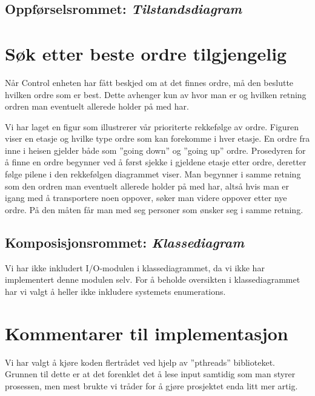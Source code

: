 \documentclass[language=norsk]{ezreport}
\begin{document}
\subsection*{Oppførselsrommet: \emph{Tilstandsdiagram}}

\newpage
\section*{Søk etter beste ordre tilgjengelig}
Når Control enheten har fått beskjed om at det finnes ordre, må den beslutte hvilken ordre som er best. Dette avhenger kun av hvor man er og hvilken retning ordren man eventuelt allerede holder på med har. 

Vi har laget en figur som illustrerer vår prioriterte rekkefølge av ordre. Figuren viser en etasje og hvilke type ordre som kan forekomme i hver etasje. En ordre fra inne i heisen gjelder både som ''going down'' og ''going up'' ordre. Prosedyren for å finne en ordre begynner ved å først sjekke i gjeldene etasje etter ordre, deretter følge pilene i den rekkefølgen diagrammet viser. Man begynner i samme retning som den ordren man eventuelt allerede holder på med har, altså hvis man er igang med å transportere noen oppover, søker man videre oppover etter nye ordre. På den måten får man med seg personer som ønsker seg i samme retning.


\subsection*{Komposisjonsrommet: \emph{Klassediagram}}


Vi har ikke inkludert I/O-modulen i klassediagrammet, da vi ikke har implementert denne modulen selv. For å beholde oversikten i klassediagrammet har vi valgt å heller ikke inkludere systemets enumerations.

\section*{Kommentarer til implementasjon}
Vi har valgt å kjøre koden flertrådet ved hjelp av ''pthreads'' biblioteket. Grunnen til dette er at det forenklet det å lese input samtidig som man styrer prosessen, men mest brukte vi tråder for å gjøre prosjektet enda litt mer artig. 
\end{document}
